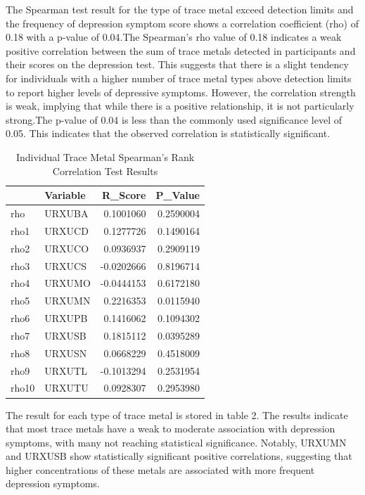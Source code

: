 \documentclass[
  man,floatsintext]{apa6}
\begin{document}
The Spearman test result for the type of trace metal exceed detection limits and the frequency of depression symptom score shows a correlation coefficient (rho) of 0.18 with a p-value of 0.04.The Spearman's rho value of 0.18 indicates a weak positive correlation between the sum of trace metals detected in participants and their scores on the depression test. This suggests that there is a slight tendency for individuals with a higher number of trace metal types above detection limits to report higher levels of depressive symptoms. However, the correlation strength is weak, implying that while there is a positive relationship, it is not particularly strong.The p-value of 0.04 is less than the commonly used significance level of 0.05. This indicates that the observed correlation is statistically significant.

\begin{table}

\caption{\label{tab:test-result-table}Individual Trace Metal Spearman's Rank Correlation Test Results}
\centering
\begin{tabular}[t]{l|l|r|r}
\hline
  & Variable & R\_Score & P\_Value\\
\hline
rho & URXUBA & 0.1001060 & 0.2590004\\
\hline
rho1 & URXUCD & 0.1277726 & 0.1490164\\
\hline
rho2 & URXUCO & 0.0936937 & 0.2909119\\
\hline
rho3 & URXUCS & -0.0202666 & 0.8196714\\
\hline
rho4 & URXUMO & -0.0444153 & 0.6172180\\
\hline
rho5 & URXUMN & 0.2216353 & 0.0115940\\
\hline
rho6 & URXUPB & 0.1416062 & 0.1094302\\
\hline
rho7 & URXUSB & 0.1815112 & 0.0395289\\
\hline
rho8 & URXUSN & 0.0668229 & 0.4518009\\
\hline
rho9 & URXUTL & -0.1013294 & 0.2531954\\
\hline
rho10 & URXUTU & 0.0928307 & 0.2953980\\
\hline
\end{tabular}
\end{table}

The result for each type of trace metal is stored in table 2. The results indicate that most trace metals have a weak to moderate association with depression symptoms, with many not reaching statistical significance. Notably, URXUMN and URXUSB show statistically significant positive correlations, suggesting that higher concentrations of these metals are associated with more frequent depression symptoms.
\end{document}
